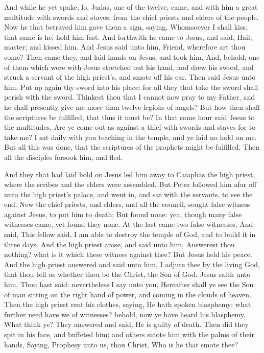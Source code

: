  And while he yet spake, lo, Judas, one of the twelve,
came, and with him a great multitude with swords and staves, from the
chief priests and elders of the people.  Now he that
betrayed him gave them a sign, saying, Whomsoever I shall kiss, that
same is he: hold him fast.  And forthwith he came to
Jesus, and said, Hail, master; and kissed him.  And Jesus
said unto him, Friend, wherefore art thou come? Then came they, and laid
hands on Jesus, and took him.  And, behold, one of them
which were with Jesus stretched out his hand, and drew his sword, and
struck a servant of the high priest's, and smote off his ear.
 Then said Jesus unto him, Put up again thy sword into
his place: for all they that take the sword shall perish with the sword.
 Thinkest thou that I cannot now pray to my Father, and
he shall presently give me more than twelve legions of angels?
 But how then shall the scriptures be fulfilled, that
thus it must be?  In that same hour said Jesus to the
multitudes, Are ye come out as against a thief with swords and staves
for to take me? I sat daily with you teaching in the temple, and ye laid
no hold on me.  But all this was done, that the
scriptures of the prophets might be fulfilled. Then all the disciples
forsook him, and fled.

 And they that had laid hold on Jesus led him away to
Caiaphas the high priest, where the scribes and the elders were
assembled.  But Peter followed him afar off unto the high
priest's palace, and went in, and sat with the servants, to see the end.
 Now the chief priests, and elders, and all the council,
sought false witness against Jesus, to put him to death; 
But found none: yea, though many false witnesses came, yet found they
none. At the last came two false witnesses,  And said,
This fellow said, I am able to destroy the temple of God, and to build
it in three days.  And the high priest arose, and said
unto him, Answerest thou nothing? what is it which these witness against
thee?  But Jesus held his peace. And the high priest
answered and said unto him, I adjure thee by the living God, that thou
tell us whether thou be the Christ, the Son of God. 
Jesus saith unto him, Thou hast said: nevertheless I say unto you,
Hereafter shall ye see the Son of man sitting on the right hand of
power, and coming in the clouds of heaven.  Then the high
priest rent his clothes, saying, He hath spoken blasphemy; what further
need have we of witnesses? behold, now ye have heard his blasphemy.
 What think ye? They answered and said, He is guilty of
death.  Then did they spit in his face, and buffeted him;
and others smote him with the palms of their hands, 
Saying, Prophesy unto us, thou Christ, Who is he that smote thee?

